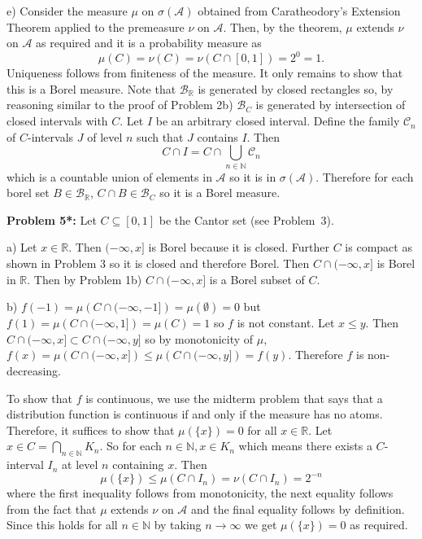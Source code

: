 \documentclass[12pt]{amsart} %
\def\N{\mathbb{N}}
\def\R{\mathbb{R}}
\def\C{\mathcal{C}}
\def\sub{\subseteq}
\def\B{\mathcal{B}}
\def\A{\mathcal{A}}
\begin{document}
\smallskip
e) Consider the measure $\mu$ on $\sigma(\A)$ obtained from Caratheodory's Extension Theorem applied to the premeasure $\nu$ on $\A$.  Then, by the theorem,  $\mu$ extends $\nu$ on $\A$ as required and it is a probability measure as  $$\mu\left( C \right) = \nu(C) = \nu\left(  C \cap [0,1] \right) = 2^0 = 1.$$ Uniqueness follows from finiteness of the measure. It only remains to show that this is a Borel measure. Note that $\B_{\R}$  is generated by closed rectangles so, by reasoning similar to the proof of Problem 2b) $\B_{C}$ is generated by intersection of closed intervals with  $C$. Let $I$ be an arbitrary closed interval. Define the family $\C_n$ of $C$-intervals $J$ of level $n$ such that $J$ contains $I$. Then $$C \cap I = C \cap \bigcup_{n \in \N} \C_n $$ which is a countable union of elements in $\A$ so it is in  $\sigma(\A)$. Therefore for each borel set $B \in \B_{\R}$, $C \cap B \in \B_{C}$ so it is a Borel measure. 


\bigskip
\noindent
\textbf{Problem 5*:}  Let $C\sub [0,1]$ be the Cantor set (see Problem~3). 

\smallskip
a) Let $x \in \R$. Then $(-\infty, x]$ is Borel because it is closed. Further $C$ is compact as shown in Problem 3 so it is closed and therefore Borel. Then  $C \cap (-\infty, x]$ is Borel in $\R$. Then by Problem 1b) $C \cap (-\infty, x]$ is a Borel subset of $C$. 

\smallskip
b) $f(-1) = \mu\left( C \cap (-\infty, -1] \right) = \mu(\emptyset) = 0$ but $f(1) = 
\mu\left( C \cap (-\infty, 1] \right) = \mu(C) = 1$ so $f$ is not constant. Let $x \le  y$. Then $C \cap (-\infty, x] \subset C \cap (-\infty, y]$ so by monotonicity of $\mu$, $f(x) = \mu\left( C \cap (-\infty, x]  \right) \le \mu\left(  C \cap (-\infty, y] \right) = f(y)$. Therefore $f$ is non-decreasing. 

To show that $f$ is continuous, we use the midterm problem that says that a distribution function is continuous if and only if the measure has no atoms. Therefore, it suffices to show that  $\mu\left( \{x\} \right) = 0$ for all $x \in \R$. Let $x \in C = \bigcap_{n \in \N} K_n$. So for each $n \in \N, x \in K_n$ which means there exists a $C$-interval $I_ n$ at level $n$ containing $x$. Then  $$\mu\left( \{x\}  \right) \le  \mu \left( C \cap I_n \right)  = \nu\left( C \cap I_n \right) = 2^{-n}$$ where the first inequality follows from monotonicity, the next equality follows from the fact that $\mu$ extends $\nu$ on $\A$ and the final equality follows by definition. Since this holds for all  $n \in \N$ by taking $n \to  \infty$ we get $\mu\left( \{x\}  \right) = 0$ as required.
\end{document}
